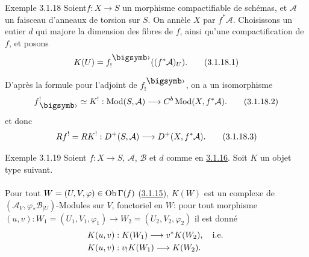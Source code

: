 \documentclass[10pt]{../fichiers-configuration-latex/smfart}
\begin{document}
\begin{enonce*}[remark]{Exemple 3.1.18}
Soient\pageoriginale $f:X\rightarrow S$ un morphisme compactifiable de
schémas, et $\mathcal{A}$ un faisceau d'anneaux de torsion sur $S$. On
annèle $X$ par $f^{\ast}\mathcal{A}$. Choisissons un entier $d$ qui
majore la dimension des fibres de $f$, ainsi qu'une compactification
de $f$, et posons 
\begin{equation*}
K(U)=f^{\bigdot}_{!}((f^{\ast}\mathcal{A})_{U}){\quoi}.\tag{3.1.18.1}
\end{equation*}
\end{enonce*}

D'après la formule  pour l'adjoint de $f^{\bigdot}_{!}$, on a
un isomorphisme
\begin{equation*}
f^{!}_{\bigdot}\simeq K^{!}:\Mod(S,\mathcal{A})\longrightarrow C^{b}\Mod(X,f^{\ast}\mathcal{A}){\quoi}.\tag{3.1.18.2}
\end{equation*}%
et donc
\begin{equation*}
Rf^{!}=RK^{!}:D^{+}(S,\mathcal{A})\longrightarrow
D^{+}(X,f^{\ast}\mathcal{A}){}.\tag{3.1.18.3}
\end{equation*}

\begin{enonce*}[remark]{Exemple 3.1.19}
Soient $f:X\rightarrow S$, $\mathcal{A}$, $\mathcal{B}$ et $d$ comme
en \hyperref[XVIII.subsubsec3.1.16]{3.1.16}. Soit $K$ un objet 
type suivant.
\end{enonce*}

\setcounter{subsubsection}{19}
\setcounter{paragraph}{0}
\paragraph{}
Pour tout $W=(U,V,\varphi)\in \operatorname{Ob} \Gamma(f)$
(\hyperref[XVIII.subsubsec3.1.15]{3.1.15}), $K(W)$ est un 
complexe de $(\mathcal{A}_{V},\varphi_{\ast}\mathcal{B}_{|U})$-Modules sur $V$,
fonctoriel en $W$: pour tout morphisme $(u,v):
W_{1}=(U_{1},V_{1},\varphi_{1})\to W_{2}=(U_{2},V_{2},\varphi_{2})$ il
est donné
\begin{align*}
K(u,v) &: K(W_{1})\longrightarrow v^{\ast}K(W_{2}),\quad\mbox{{i.e.}\kern.3em}\\
K(u,v) &: v_{!}K(W_{1})\longrightarrow K(W_{2}){}.
\end{align*}
\end{document}
